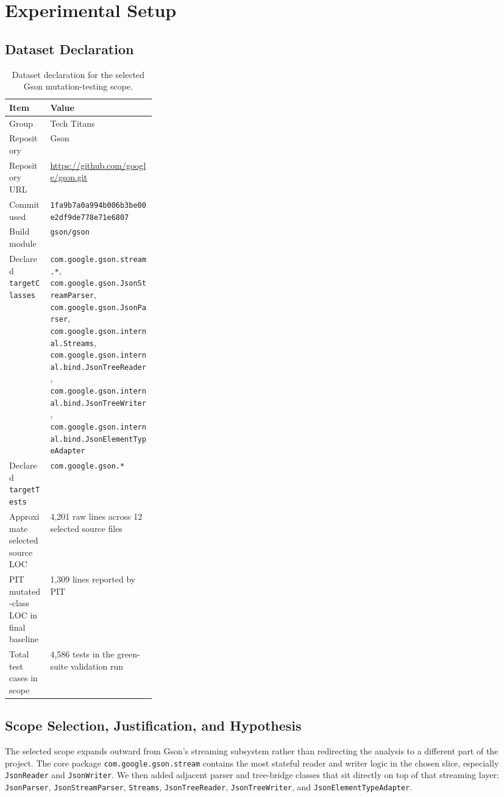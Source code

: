 \documentclass[11pt]{article}
\begin{document}
\section{Experimental Setup}
\subsection{Dataset Declaration}
\begin{table}[H]
\centering
\small
\begin{tabularx}{\linewidth}{>{\raggedright\arraybackslash}p{0.28\linewidth}X}
\toprule
Item & Value \\
\midrule
Group & Tech Titans \\
Repository & Gson \\
Repository URL & \url{https://github.com/google/gson.git} \\
Commit used & \texttt{1fa9b7a0a994b006b3be00e2df9de778e71e6807} \\
Build module & \texttt{gson/gson} \\
Declared \texttt{targetClasses} &
\texttt{com.google.gson.stream.*},
\texttt{com.google.gson.JsonStreamParser},
\texttt{com.google.gson.JsonParser},
\texttt{com.google.gson.internal.Streams},
\texttt{com.google.gson.internal.bind.JsonTreeReader},
\texttt{com.google.gson.internal.bind.JsonTreeWriter},
\texttt{com.google.gson.internal.bind.JsonElementTypeAdapter} \\
Declared \texttt{targetTests} & \texttt{com.google.gson.*} \\
Approximate selected source LOC & 4,201 raw lines across 12 selected source files \\
PIT mutated-class LOC in final baseline & 1,309 lines reported by PIT \\
Total test cases in scope & 4,586 tests in the green-suite validation run \\
\bottomrule
\end{tabularx}
\caption{Dataset declaration for the selected Gson mutation-testing scope.}
\end{table}

\subsection{Scope Selection, Justification, and Hypothesis}
The selected scope expands outward from Gson's streaming subsystem rather than redirecting the analysis to a different part of the project. The core package \texttt{com.google.gson.stream} contains the most stateful reader and writer logic in the chosen slice, especially \texttt{JsonReader} and \texttt{JsonWriter}. We then added adjacent parser and tree-bridge classes that sit directly on top of that streaming layer: \texttt{JsonParser}, \texttt{JsonStreamParser}, \texttt{Streams}, \texttt{JsonTreeReader}, \texttt{JsonTreeWriter}, and \texttt{JsonElementTypeAdapter}.
\end{document}

